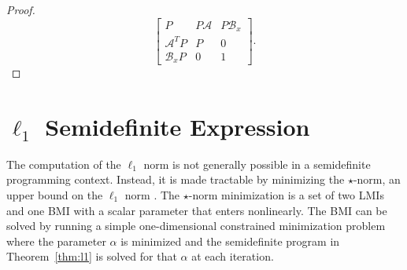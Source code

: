 \begin{proof}
	\begin{equation*}
		\begin{bmatrix}
			P & P\mathcal{A} & P\mathcal{B}_x \\
			\mathcal{A}^TP & P & 0 \\
			\mathcal{B}_xP & 0 & 1
		\end{bmatrix}.
	\end{equation*}
\end{proof}

\section{$\ell_1$ Semidefinite Expression}
\label{sec:opt-l1}

The computation of the $\ell_1$ norm is not generally possible in a semidefinite programming context. Instead, it is made tractable by minimizing the $\star$-norm, an upper bound on the $\ell_1$ norm \cite{Venkatesh1995}. The $\star$-norm minimization is a set of two \gls{LMI}s and one \gls{BMI} with a scalar parameter that enters nonlinearly. The \gls{BMI} can be solved by running a simple one-dimensional constrained minimization problem where the parameter $\alpha$ is minimized and the semidefinite program in Theorem~\ref{thm:l1} is solved for that $\alpha$ at each iteration.

